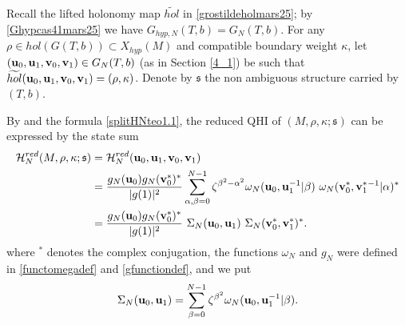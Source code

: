 \documentclass[11pt]{amsart}
\newcommand{\bu}{{\bf u}}
\newcommand{\bv}{{\bf v}}
\newcommand{\Hh}{{\mathcal H}}
\begin{document}
{Recall the lifted holonomy map $\widetilde{hol}$ in \eqref{grostildeholmars25}; by \eqref{Ghypcas41mars25} we have $G_{hyp,N}(T,b)=G_N(T,b)$. For any $\rho \in hol(G(T,b))\subset X_{hyp}(M)$ and compatible boundary weight $\kappa$, let $(\bu_0,\bu_1,\bv_0,\bv_1)\in G_N(T,b)$ (as in Section \ref{4_1}) be such that $\widetilde{hol}(\bu_0,\bu_1,\bv_0,\bv_1)=(\rho,\kappa)$.  Denote by $\mathfrak{s}$ the non ambiguous structure carried by $(T,b)$. 

By \cite[Section 6.4, page 912]{AGT0} and the formula \eqref{splitHNteo1.1}, the reduced QHI of $(M,\rho,\kappa;\mathfrak{s})$ can be expressed by the state sum 
\begin{align}
\Hh_{N}^{red}(M,\rho,\kappa; \mathfrak{s}) & =  \Hh_{N}^{red}(\bu_0,\bu_1,\bv_0,\bv_1)\notag \\
& =  \frac{g_N(\bu_0)g_N(\bv_0^*)^*}{|g(1)|^2}\sum_{\alpha,\beta=0}^{N-1}
  \zeta^{\beta^2-\alpha^2} \omega_N(\bu_0,\bu_1^{-1}\vert \beta)\
  \omega_N(\bv_0^*,\bv_1^*{}^{-1}\vert \alpha)^*\nonumber \\
& = \frac{g_N(\bu_0)g_N(\bv_0^*)^*}{|g(1)|^2}\ \Sigma_N(\bu_0,\bu_1)\ \Sigma_N(\bv_0^*,\bv_1^*)^*  \label{form1} .
\end{align}
where $^*$ denotes the complex conjugation, the functions $\omega_N$ and $g_N$ were defined in \eqref{functomegadef} and \eqref{gfunctiondef}, and we put
\begin{equation}\label{sumS}
\Sigma_N(\bu_0,\bu_1) = \sum_{\beta=0}^{N-1} \zeta^{\beta^2}
\omega_N(\bu_0,\bu_1^{-1}\vert \beta).
\end{equation} 
 
}
\end{document}
